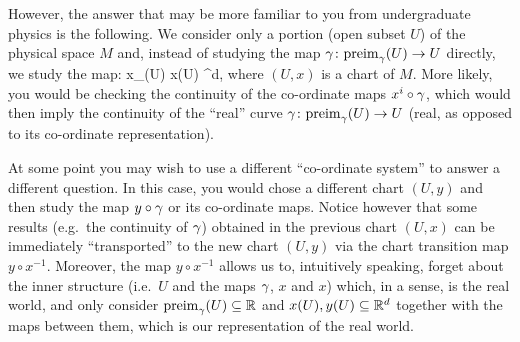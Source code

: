 However, the answer that may be more familiar to you from undergraduate physics is the following. We consider only a portion (open subset $U$) of the physical space $M$ and, instead of studying the map $\gamma\colon\mathrm{preim}_\gamma(U)\to U$ directly, we study the map:
\bse
x\circ \g\cl {}_\g(U) \to x(U) \se \R^d,
\ese
where $(U,x)$ is a chart of $M$. More likely, you would be checking the continuity of the co-ordinate maps $x^i\circ \gamma$, which would then imply the continuity of the ``real'' curve $\gamma\colon\mathrm{preim}_\gamma(U)\to U$ (real, as opposed to its co-ordinate representation).
\bse
{}
\ese
At some point you may wish to use a different ``co-ordinate system'' to answer a different question. In this case, you would chose a different chart $(U,y)$ and then study the map $y\circ \gamma$ or its co-ordinate maps. Notice however that some results (e.g.\ the continuity of $\gamma$) obtained in the previous chart $(U,x)$ can be immediately ``transported'' to the new chart $(U,y)$ via the chart transition map $y\circ x^{-1}$. Moreover, the map $y\circ x^{-1}$ allows us to, intuitively speaking, forget about the inner structure (i.e.\ $U$ and the maps $\gamma$, $x$ and $x$) which, in a sense, is the real world, and only consider $\mathrm{preim}_\gamma(U)\subseteq \mathbb{R}$ and $x(U),y(U)\subseteq\mathbb{R}^d$ together with the maps between them, which is our representation of the real world.














